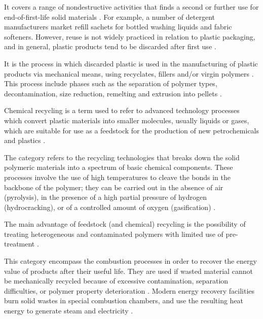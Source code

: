 \begin{description}[labelindent=0.5cm, noitemsep]
\item[Reuse:] It covers a range of nondestructive activities that finds a second or further use for end-of-first-life solid materials \parencite{Cooper2015}.
For example, a number of detergent manufacturers market refill sachets for bottled washing liquids and fabric softeners.
However, reuse is not widely practiced in relation to plastic packaging, and in general, plastic products tend to be discarded after first use \parencite{Hamad2013}.
	
\item[Mechanical recycling] It is the process in which discarded plastic is used in the manufacturing of plastic products via mechanical means, using recyclates, fillers and/or virgin polymers  \parencite{Fisher2004, Hopewell2009, Al-Salem2009, Perugini2005}.
	This process include phases such as the separation of polymer types, decontamination, size reduction, remelting and extrusion into pellets \parencite{Lazarevic2010}. 
	
\item[Chemical recycling:] Chemical recycling is a term used to refer to advanced technology processes which convert plastic materials into smaller molecules, usually liquids or gases, which are suitable for use as a feedstock for the production of new petrochemicals and plastics \parencite{Al-Salem2009}.
	
\item[Feedstock recycling:] The category refers to the recycling technologies that breaks down the solid polymeric materials into a spectrum of basic chemical components.
These processes involve the use of high temperatures to cleave the bonds in the backbone of the polymer; they can be carried out in the absence of air (pyrolysis), in the presence of a high partial pressure of hydrogen (hydrocracking), or of a controlled amount of oxygen (gasification) \parencite{Perugini2005}.

The main advantage of feedstock (and chemical) recycling is the possibility of treating heterogeneous and contaminated polymers with limited use of pre-treatment \parencite{Al-Salem2009}.


\item[Energy recovery:] This category encompass the combustion processes in order to recover the energy value of products after their useful life. 
They are used if wasted material cannot be mechanically recycled because of excessive contamination, separation difficulties, or polymer property deterioration \parencite{Perugini2005}.
Modern energy recovery facilities burn solid wastes in special combustion chambers, and use the resulting heat energy to generate steam and electricity \parencite{Subramanian2000}.


\end{description}
